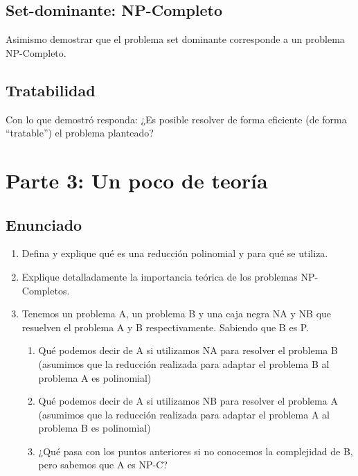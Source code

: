 \documentclass[titlepage,a4paper]{article}
\begin{document}


\newpage\subsection{Set-dominante: NP-Completo}\label{sec:parte2_2}
\begin{tcolorbox}[colback=blue!5!white,colframe=blue!75!black,title=Enunciado P2.2]
    Asimismo demostrar que el problema set dominante corresponde a un problema NP-Completo.
\end{tcolorbox}



\newpage\subsection{Tratabilidad}\label{sec:parte2_3}
\begin{tcolorbox}[colback=blue!5!white,colframe=blue!75!black,title=Enunciado P2.2]
    Con lo que demostró responda: ¿Es posible resolver de forma eficiente
    (de forma “tratable”) el problema planteado?
\end{tcolorbox}





\setcounter{section}{2}%
\renewcommand{\thesection}{P\arabic{section}}%

\newpage\section{Parte 3: Un poco de teoría}\label{sec:parte3}

\setcounter{subsection}{0}%
\renewcommand{\thesubsection}{\alph{subsection}}%

\subsection{Enunciado}
\begin{enumerate}
    \item Defina y explique qué es una reducción polinomial y para qué se utiliza.
    \item Explique detalladamente la importancia teórica de los problemas NP-Completos.
    \item Tenemos un problema A, un problema B y una caja negra NA y NB que resuelven el
        problema A y B respectivamente. Sabiendo que B es P.\begin{enumerate}
            \item Qué podemos decir de A si utilizamos NA para resolver el problema B (asumimos que la reducción realizada para adaptar el problema B al problema A es polinomial)
            \item Qué podemos decir de A si utilizamos NB para resolver el problema A (asumimos que la reducción realizada para adaptar el problema A al problema B es polinomial)
            \item ¿Qué pasa con los puntos anteriores si no conocemos la complejidad de B, pero sabemos que A es NP-C?
        \end{enumerate}
\end{enumerate}
\end{document}
